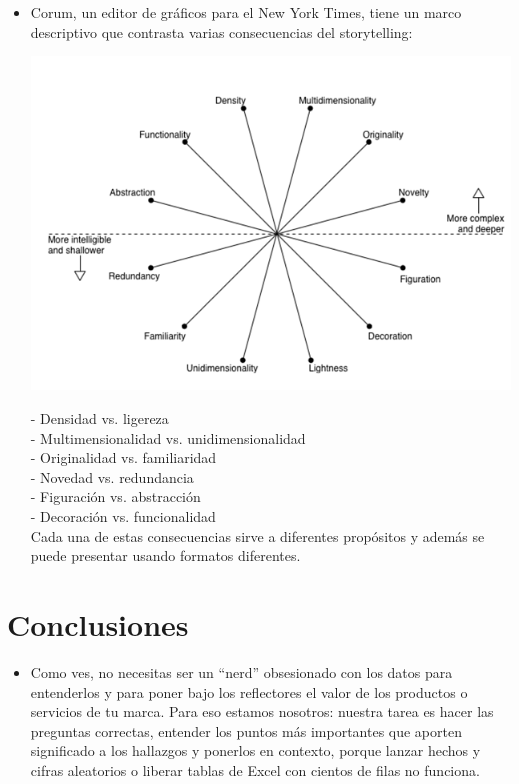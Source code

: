 {{\begin{itemize}
\item  Corum, un editor de gráficos para el New York Times, tiene un marco descriptivo que contrasta varias consecuencias del storytelling:

		\begin{center}
		\includegraphics[width=15cm]{./Imagenes/Ejemplo1}
		\end{center}
		
- Densidad vs. ligereza\\
- Multimensionalidad vs. unidimensionalidad\\
- Originalidad vs. familiaridad\\
- Novedad vs. redundancia\\
- Figuración vs. abstracción\\
- Decoración vs. funcionalidad\\

Cada una de estas consecuencias sirve a diferentes propósitos y además se puede presentar usando formatos diferentes.

	\end{itemize}

\section{Conclusiones}

\begin{itemize}
\item Como ves, no necesitas ser un “nerd” obsesionado con los datos para entenderlos y para poner bajo los reflectores el valor de los productos o servicios de tu marca. Para eso estamos nosotros: nuestra tarea es hacer las preguntas correctas, entender los puntos más importantes que aporten significado a los hallazgos y ponerlos en contexto, porque lanzar hechos y cifras aleatorios o liberar tablas de Excel con cientos de filas no funciona. 


\end{itemize}}}
